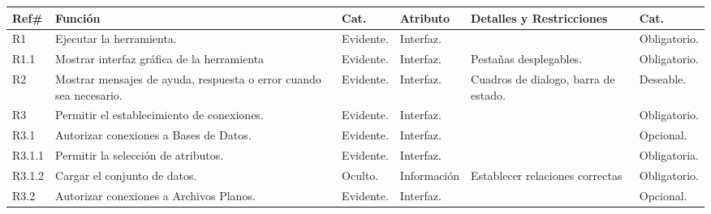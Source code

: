 %
\begin{center}
\begin{tabular}{|l|p{4cm}|l|l|p{4cm}|l|}\hline
\textbf{Ref\#} & \textbf{Funci\'on} & \textbf{Cat.} & \textbf{Atributo} & \textbf{Detalles y Restricciones} &
\textbf{Cat.} \\ \hline
R1 & Ejecutar la herramienta. & Evidente. & Interfaz. &  & Obligatorio. \\ \hline
R1.1 & Mostrar interfaz gr\'afica de la herramienta & Evidente. & Interfaz. & Pesta\~nas desplegables. & Obligatorio. \\ \hline
R2 & Mostrar mensajes de ayuda, respuesta o error cuando sea necesario. & Evidente. & Interfaz. & Cuadros de dialogo, barra de estado. & Deseable. \\ \hline
R3 & Permitir el establecimiento de conexiones. & Evidente. & Interfaz. &  & Obligatorio. \\ \hline
R3.1 & Autorizar conexiones a Bases de Datos. & Evidente. & Interfaz. &  & Opcional. \\ \hline
R3.1.1 & Permitir la selecci\'on de atributos. & Evidente. & Interfaz. &  & Obligatoria. \\ \hline
R3.1.2 & Cargar el conjunto de datos. & Oculto. & Informaci\'on & Establecer relaciones correctas & Obligatorio.
\\ \hline
R3.2 & Autorizar conexiones a Archivos Planos. & Evidente. & Interfaz. &  & Opcional. \\ \hline

\end{tabular}


\end{center}
